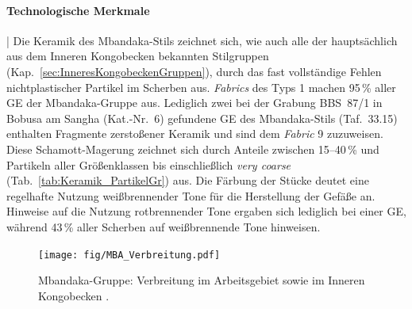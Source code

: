 \paragraph{Technologische Merkmale}\hspace{-.5em}|\hspace{.5em}%
Die Keramik des Mbandaka-Stils zeichnet sich, wie auch alle der hauptsächlich aus dem Inneren Kongobecken bekannten Stilgruppen (Kap.~\ref{sec:InneresKongobeckenGruppen}), durch das fast vollständige Fehlen nichtplastischer Partikel im Scherben aus. \textit{Fabrics} des Typs 1 machen 95\,\% aller GE der Mbandaka-Gruppe aus. Lediglich zwei bei der Grabung BBS~87/1 in Bobusa am \mbox{Sangha} (Kat.-Nr.~6) gefundene GE des Mbandaka-Stils (Taf.~33.15) enthalten Fragmente zerstoßener Keramik und sind dem \textit{Fabric} 9 zuzuweisen. Diese Schamott-Magerung zeichnet sich durch Anteile zwischen 15--40\,\% und Partikeln aller Größenklassen bis einschließlich \textit{very coarse} (Tab.~\ref{tab:Keramik_PartikelGr}) aus. Die Färbung der Stücke deutet eine regelhafte Nutzung weißbrennender Tone für die Herstellung der Gefäße an. Hinweise auf die Nutzung rotbrennender Tone ergaben sich lediglich bei einer GE, während 43\,\% aller Scherben auf weißbrennende Tone hinweisen.

\begin{figure}[p]
	\centering
	\texttt{[image: fig/MBA\_Verbreitung.pdf]}
	\caption{Mbandaka-Gruppe: Verbreitung im Arbeitsgebiet sowie im Inneren Kongobecken \parencite[grau nach][560--561 Karte 10]{Wotzka.1995}.}
	\label{fig:MBA_Verbreitung}
\end{figure}


